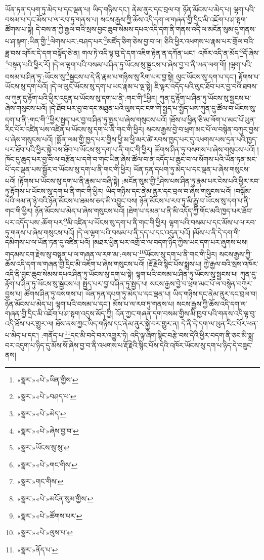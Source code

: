 ཡོན་ཏན་དཔག་ཏུ་མེད་པ་དང་ལྡན་པ། ཡིད་གཉིས་དང་། ནེམ་ནུར་དང་བྲལ་བ། ཉོན་མོངས་པ་མེད་པ། ལྷག་པའི་བསམ་པ་དང་མོས་པ་ལ་རབ་ཏུ་གནས་པ། སངས་རྒྱས་ཀྱི་ཆོས་འདི་དག་ལ་གཞན་གྱི་དྲིང་མི་འཇོག་པ་ཤ་སྟག་ཚོགས་པ་སྟེ། དེ་བས་ན་ཀྱེ་རྒྱལ་བའི་སྲས་བྱང་ཆུབ་སེམས་དཔའ་འདི་དག་ནི་གནས་འདི་ལ་མངོན་སུམ་དུ་གནས་པ་ཤ་སྟག་:ཡིན་གྱི་\footnote{«སྣར་»«པེ་»ཡིན་གྱིས་}ལེགས་པར་:བཤད་པར་\footnote{«སྣར་»«པེ་»བཤད་པ་}མཛོད་ཅིག་ཅེས་བྱ་བ་ལ། ཅིའི་ཕྱིར་འཕགས་པ་རྣམ་པར་གྲོལ་བའི་ཟླ་བས་འཁོར་དེ་དག་བསྟོད་ཅེ་ན། གལ་ཏེ་འདི་ལྟ་བུ་དེ་དག་འཇིག་རྟེན་ན་དཀོན་ཡང་། འཁོར་འདི་ན་མོད་\footnote{«སྣར་»«པེ་»མེད་}དོ་ཞེས་\footnote{«སྣར་»«པེ་»ཞེས་བྱ་བ་}བསྟན་པའི་ཕྱིར་རོ། །དེ་ལ་ལྷག་པའི་བསམ་པ་ཤིན་ཏུ་ཡོངས་སུ་སྦྱངས་པ་ཞེས་བྱ་བ་ནི་ཡན་ལག་གོ། །ལྷག་པའི་བསམ་པ་ཤིན་ཏུ་:ཡོངས་སུ་\footnote{«སྣར་»ཡོངས་སུ་སུ་}སྦྱངས་པ་དེ་ནི་རྣམ་པ་གཉིས་སུ་རིག་པར་བྱ་སྟེ། ལུང་ཡོངས་སུ་དག་པ་དང་། རྟོགས་པ་ཡོངས་སུ་དག་པའོ། །དེ་ལ་ལུང་ཡོངས་སུ་དག་པ་ཡང་རྣམ་པ་ལྔ་སྟེ། ཇི་ལྟར་འདོད་པའི་ལུང་ཐོབ་པར་བྱ་བའི་ཐབས་ལ་ཀུན་དུ་རྟོག་པའི་ཕྱིར་འདུན་པ་ཡོངས་སུ་དག་པ་ནི་:གང་གི་\footnote{«སྣར་»«པེ་»གང་གིས་}ཕྱིར། ཀུན་དུ་རྟོག་པ་ཤིན་ཏུ་ཡོངས་སུ་སྦྱངས་པ་ཞེས་གསུངས་པའོ། །དེ་ཐོབ་པར་བྱ་བ་དང་མཐུན་པའི་ལུས་དང་ངག་གི་སྤྱད་པ་སྤྱོད་པས་ཀུན་དུ་ཚོལ་བ་ཡོངས་སུ་དག་པ་ནི་:གང་གི་\footnote{«སྣར་»གང་གིས་}ཕྱིར་སྤྱད་པར་བྱ་བ་ཤིན་ཏུ་སྤྱད་པ་ཞེས་གསུངས་པའོ། །ཐོས་པ་ཕྱིན་ཅི་མ་ལོག་པ་མང་པོ་ཡུན་རིང་པོར་འཛིན་པས་འཛིན་པ་ཡོངས་སུ་དག་པ་ནི་གང་གི་ཕྱིར། སངས་རྒྱས་བྱེ་བ་ཕྲག་མང་པོ་ལ་བསྙེན་བཀུར་བྱས་པ་ཞེས་གསུངས་པའོ། །སྨོན་ལམ་གྱི་ཁྱད་པར་གྱིས་ཕྱི་མ་ཕྱི་མར་ཚེ་རབས་ཁྱད་པར་དུ་འཕགས་པས་དྲན་པའི་ཁྱད་པར་ཐོབ་པའི་ཕྱིར་སྐྱེ་བས་ཐོབ་པ་ཡོངས་སུ་དག་པ་ནི་གང་གི་ཕྱིར། ཚོགས་ཤིན་ཏུ་བསགས་པ་ཞེས་གསུངས་པའོ། །ཁོང་དུ་ཆུད་པར་བྱ་བ་ལ་བརྩོན་པ་དགེ་བ་གང་ཡིན་ཞེས་ཚོལ་བ་ན་འདོད་པ་ཆུང་བ་ལ་སོགས་པའི་ཡོན་ཏན་མང་པོ་དང་ལྡན་པས་སྦྱོར་བ་ཡོངས་སུ་དག་པ་ནི་གང་གི་ཕྱིར། ཡོན་ཏན་དཔག་ཏུ་མེད་པ་དང་ལྡན་པ་ཞེས་གསུངས་པའོ། །རྟོགས་པ་ཡོངས་སུ་དག་པ་ནི་རྣམ་པ་བཞི་སྟེ། :མངོན་སུམ་གྱི་\footnote{«སྣར་»«པེ་»མངོན་སུམ་གྱིས་}ཤེས་པས་ཤིན་ཏུ་རྣམ་པར་ངེས་པའི་ཕྱིར་རབ་ཏུ་རྟོགས་པ་ཡོངས་སུ་དག་པ་ནི་གང་གི་ཕྱིར། ཡིད་གཉིས་དང་ནེམ་ནུར་དང་བྲལ་བ་ཞེས་གསུངས་པའོ། །བསྒོམ་པའི་ལམ་ན་ཉེ་བའི་ཉོན་མོངས་པ་ཐམས་ཅད་མི་འབྱུང་བས། ཉོན་མོངས་པ་རབ་ཏུ་མི་རྒྱུ་བ་ཡོངས་སུ་དག་པ་ནི་གང་གི་ཕྱིར། ཉོན་མོངས་པ་མེད་པ་ཞེས་གསུངས་པའོ། །ཐེག་པ་དམན་པ་ནི་མི་འདོད་ཀྱི་གོང་མའི་ཁྱད་པར་ཐོབ་པར་འདོད་པས་:ཆོག་པར་\footnote{«སྣར་»«པེ་»ཚོགས་པར་}མི་འཛིན་པ་ཡོངས་སུ་དག་པ་ནི་གང་གི་ཕྱིར། ལྷག་པའི་བསམ་པ་དང་མོས་པ་ལ་རབ་ཏུ་གནས་པ་ཞེས་གསུངས་པའོ། །དེ་ལ་ལྷག་པའི་བསམ་པ་ནི་དད་པ་དང་འདུན་པའོ། །མོས་པ་ནི་དེ་དག་གི་དམིགས་པ་ལ་ཡོན་ཏན་དུ་འཛིན་པའོ། །མཐར་ཕྱིན་པར་འགྲོ་བ་ལ་བདག་ཉིད་ཀྱིས་ཡང་དག་པར་ཞུགས་པས། གདམས་ངག་རྗེས་སུ་བསྟན་པ་ལ་གཞན་ལ་རག་མ་:ལས་པ་\footnote{«སྣར་»«པེ་»ལུས་པ་}ཡོངས་སུ་དག་པ་ནི་གང་གི་ཕྱིར། སངས་རྒྱས་ཀྱི་ཆོས་འདི་དག་ལ་གཞན་གྱི་དྲིང་མི་འཇོག་པ་ཞེས་གསུངས་པའོ། །རྡོ་རྗེའི་སྙིང་པོས་སྨྲས་པ། ཀྱེ་རྒྱལ་བའི་སྲས་འཁོར་འདི་ནི་བྱང་ཆུབ་སེམས་དཔའ་ཤིན་ཏུ་ཡོངས་སུ་དག་པ་སྟེ། ལྷག་པའི་བསམ་པ་ཤིན་ཏུ་ཡོངས་སུ་སྦྱངས་པ། ཀུན་དུ་རྟོག་པ་ཤིན་ཏུ་ཡོངས་སུ་སྦྱངས་པ། སྤྱད་པར་བྱ་བ་ཤིན་ཏུ་སྤྱད་པ། སངས་རྒྱས་བྱེ་བ་ཕྲག་མང་པོ་ལ་བསྙེན་བཀུར་བྱས་པ། ཚོགས་ཤིན་ཏུ་བསགས་པ། ཡོན་ཏན་དཔག་ཏུ་མེད་པ་དང་ལྡན་པ། ཡིད་གཉིས་དང་ནེམ་ནུར་དང་བྲལ་བ། ཉོན་མོངས་པ་མེད་པ། ལྷག་པའི་བསམ་པ་དང་། མོས་པ་ལ་རབ་ཏུ་གནས་པ། སངས་རྒྱས་ཀྱི་ཆོས་འདི་དག་ལ་གཞན་གྱི་དྲིང་མི་འཇོག་པ་ཤ་སྟག་འདུས་མོད་ཀྱི། འོན་ཀྱང་གཞན་དག་བསམ་གྱིས་མི་ཁྱབ་པའི་གནས་འདི་ལྟ་བུ་འདི་ཐོས་པར་གྱུར་ལ། ཐོས་ནས་ཀྱང་ཡིད་གཉིས་དང་ནེམ་ནུར་སྐྱེ་བར་གྱུར་ན། དེ་ནི་དེ་དག་ལ་ཡུན་རིང་པོར་ཕན་པ་མེད་པ་དང་། :གནོད་པ་\footnote{«སྣར་»ནོད་པ་}དང་མི་བདེ་བར་འགྱུར་ཏེ། འདི་ལྟ་ཞིག་སྙིང་བརྩེ་བས་དེའི་ཕྱིར་བདག་ནི་ཅང་མི་སྨྲ་བར་འདུག་པ་ཉིད་དུ་མོས་སོ་ཞེས་བྱ་བ་ནི་འཕགས་པ་རྡོ་རྗེའི་སྙིང་པོས་དེའི་འཁོར་ཡོངས་སུ་དག་པ་ཉིད་དེ་བཟུང་ནས། 
